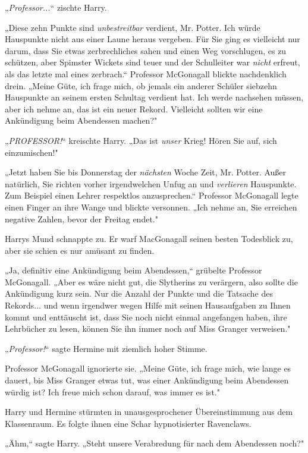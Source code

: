 {„\emph{Professor...}“ zischte Harry.

„Diese zehn Punkte sind \emph{unbestreitbar} verdient, Mr. Potter. Ich würde Hauspunkte nicht aus einer Laune heraus vergeben. Für Sie ging es vielleicht nur darum, dass Sie etwas zerbrechliches sahen und einen Weg vorschlugen, es zu schützen, aber Spimster Wickets sind teuer und der Schulleiter war \emph{nicht} erfreut, als das letzte mal eines zerbrach.“ Professor McGonagall blickte nachdenklich drein. „Meine Güte, ich frage mich, ob jemals ein anderer Schüler siebzehn Hauspunkte an seinem ersten Schultag verdient hat. Ich werde nachsehen müssen, aber ich nehme an, das ist ein neuer Rekord. Vielleicht sollten wir eine Ankündigung beim Abendessen machen?"

„\emph{PROFESSOR!}“ kreischte Harry. „Das ist \emph{unser} Krieg! Hören Sie auf, sich einzumischen!"

„Jetzt haben Sie bis Donnerstag der \emph{nächsten} Woche Zeit, Mr. Potter. Außer natürlich, Sie richten vorher irgendwelchen Unfug an und \emph{verlieren} Hauspunkte. Zum Beispiel einen Lehrer respektlos anzusprechen.“ Professor McGonagall legte einen Finger an ihre Wange und blickte versonnen. „Ich nehme an, Sie erreichen negative Zahlen, bevor der Freitag endet."

Harrys Mund schnappte zu. Er warf MacGonagall seinen besten Todesblick zu, aber sie schien es nur amüsant zu finden.

„Ja, definitiv eine Ankündigung beim Abendessen,“ grübelte Professor McGonagall. „Aber es wäre nicht gut, die Slytherins zu verärgern, also sollte die Ankündigung kurz sein. Nur die Anzahl der Punkte und die Tatsache des Rekords... und wenn irgendwer wegen Hilfe mit seinen Hausaufgaben zu Ihnen kommt und enttäuscht ist, dass Sie noch nicht einmal angefangen haben, ihre Lehrbücher zu lesen, können Sie ihn immer noch auf Miss Granger verweisen."

„\emph{Professor!}“ sagte Hermine mit ziemlich hoher Stimme.

Professor McGonagall ignorierte sie. „Meine Güte, ich frage mich, wie lange es dauert, bis Miss Granger etwas tut, was einer Ankündigung beim Abendessen würdig ist? Ich freue mich schon darauf, was immer es ist."

Harry und Hermine stürmten in unausgesprochener Übereinstimmung aus dem Klassenraum. Es folgte ihnen eine Schar hypnotisierter Ravenclaws.

„Ähm,“ sagte Harry. „Steht unsere Verabredung für nach dem Abendessen noch?"

}
